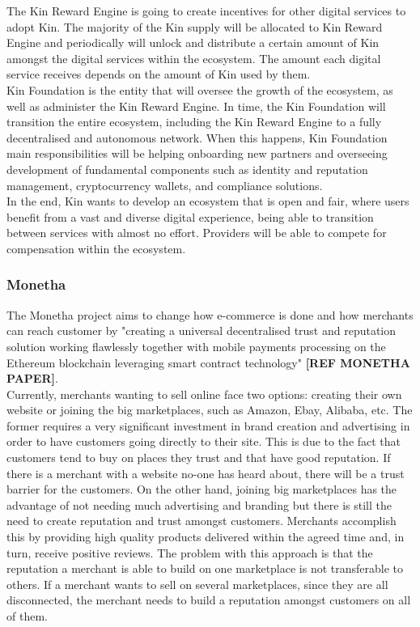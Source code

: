 The Kin Reward Engine is going to create incentives for other digital services to adopt Kin. The majority of the Kin supply will be allocated to Kin Reward Engine and periodically will unlock and distribute a certain amount of Kin amongst the digital services within the ecosystem. The amount each digital service receives depends on the amount of Kin used by them. \\

Kin Foundation is the entity that will oversee the growth of the ecosystem, as well as administer the Kin Reward Engine. In time, the Kin Foundation will transition the entire ecosystem, including the Kin Reward Engine to a fully decentralised and autonomous network. When this happens, Kin Foundation main responsibilities will be helping onboarding new partners and overseeing development of fundamental components such as identity and reputation management, cryptocurrency wallets, and compliance solutions. \\

In the end, Kin wants to develop an ecosystem that is open and fair, where users benefit from a vast and diverse digital experience, being able to transition between services with almost no effort. Providers will be able to compete for compensation within the ecosystem.

\subsubsection{Monetha}

The Monetha project aims to change how e-commerce is done and how merchants can reach customer by "creating a universal decentralised trust and reputation solution working flawlessly together with mobile payments processing on the Ethereum blockchain leveraging smart contract technology" \textbf{[REF MONETHA PAPER]}. \\

Currently, merchants wanting to sell online face two options: creating their own website or joining the big marketplaces, such as Amazon, Ebay, Alibaba, etc. The former requires a very significant investment in brand creation and advertising in order to have customers going directly to their site. This is due to the fact that customers tend to buy on places they trust and that have good reputation. If there is a merchant with a website no-one has heard about, there will be a trust barrier for the customers. On the other hand, joining big marketplaces has the advantage of not needing much advertising and branding but there is still the need to create reputation and trust amongst customers. Merchants accomplish this by providing high quality products delivered within the agreed time and, in turn, receive positive reviews. The problem with this approach is that the reputation a merchant is able to build on one marketplace is not transferable to others. If a merchant wants to sell on several marketplaces, since they are all disconnected, the merchant needs to build a reputation amongst customers on all of them.

